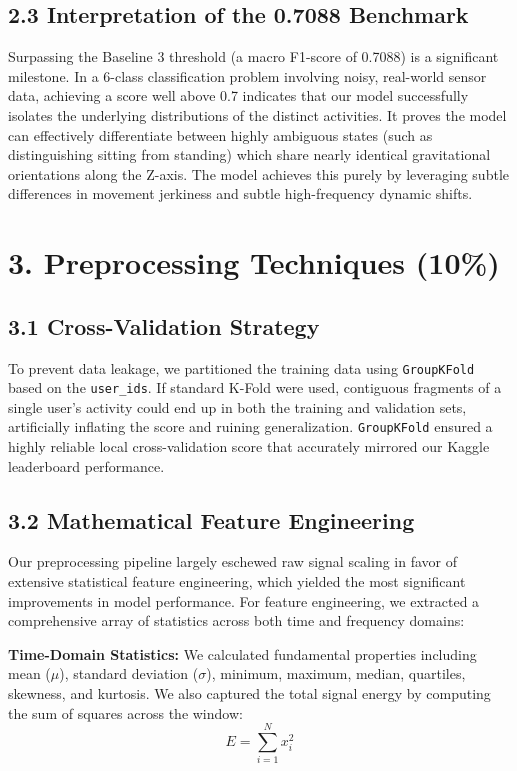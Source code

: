 \documentclass[12pt, a4paper]{article}
\begin{document}
\subsection*{2.3 Interpretation of the 0.7088 Benchmark}
Surpassing the Baseline 3 threshold (a macro F1-score of 0.7088) is a significant milestone. In a 6-class classification problem involving noisy, real-world sensor data, achieving a score well above 0.7 indicates that our model successfully isolates the underlying distributions of the distinct activities. It proves the model can effectively differentiate between highly ambiguous states (such as distinguishing sitting from standing) which share nearly identical gravitational orientations along the Z-axis. The model achieves this purely by leveraging subtle differences in movement jerkiness and subtle high-frequency dynamic shifts.

\section*{3. Preprocessing Techniques (10\%)}

\subsection*{3.1 Cross-Validation Strategy}
To prevent data leakage, we partitioned the training data using \texttt{GroupKFold} based on the \texttt{user\_ids}. If standard K-Fold were used, contiguous fragments of a single user's activity could end up in both the training and validation sets, artificially inflating the score and ruining generalization. \texttt{GroupKFold} ensured a highly reliable local cross-validation score that accurately mirrored our Kaggle leaderboard performance.

\subsection*{3.2 Mathematical Feature Engineering}
Our preprocessing pipeline largely eschewed raw signal scaling in favor of extensive statistical feature engineering, which yielded the most significant improvements in model performance. For feature engineering, we extracted a comprehensive array of statistics across both time and frequency domains:

\textbf{Time-Domain Statistics:} We calculated fundamental properties including mean ($\mu$), standard deviation ($\sigma$), minimum, maximum, median, quartiles, skewness, and kurtosis. We also captured the total signal energy by computing the sum of squares across the window:
\begin{equation}
    E = \sum_{i=1}^{N} x_i^2
\end{equation}
\end{document}
